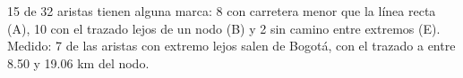 {15 de 32 aristas tienen alguna marca: 8 con carretera menor que la línea recta (A), 10 con el trazado lejos de un nodo (B) y 2 sin camino entre extremos (E).}
{Medido: 7 de las aristas con extremo lejos salen de Bogotá, con el trazado a entre 8.50 y 19.06 km del nodo.}
